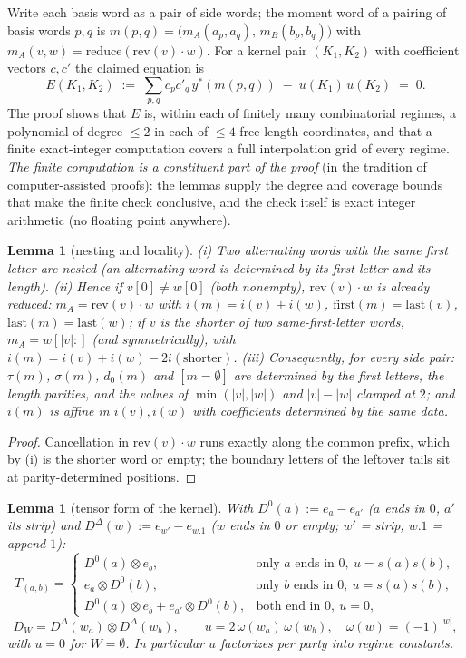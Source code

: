 \documentclass[11pt]{article}
\newtheorem{lemma}[theorem]{Lemma}
\begin{document}
Write each basis word as a pair of side words; the moment word of a
pairing of basis words $p,q$ is
$m(p,q)=\bigl(m_A(a_p,a_q),\,m_B(b_p,b_q)\bigr)$ with
$m_A(v,w)=\mathrm{reduce}(\mathrm{rev}(v)\cdot w)$. For a kernel pair
$(K_1,K_2)$ with coefficient vectors $c,c'$ the claimed equation is
\[
E(K_1,K_2)\;:=\;\sum_{p,q}c_pc'_q\,y^\ast(m(p,q))\;-\;u(K_1)\,u(K_2)
\;=\;0 .
\]
The proof shows that $E$ is, within each of finitely many combinatorial
regimes, a polynomial of degree $\le2$ in each of $\le4$ free length
coordinates, and that a finite exact-integer computation covers a full
interpolation grid of every regime. \emph{The finite computation is a
constituent part of the proof} (in the tradition of computer-assisted
proofs): the lemmas supply the degree and coverage bounds that make the
finite check conclusive, and the check itself is exact integer arithmetic
(no floating point anywhere).

\begin{lemma}[nesting and locality]\label{lem:nest}
(i) Two alternating words with the same first letter are nested (an
alternating word is determined by its first letter and its length).
(ii) Hence if $v[0]\ne w[0]$ (both nonempty), $\mathrm{rev}(v)\cdot w$ is
already reduced: $m_A=\mathrm{rev}(v)\cdot w$ with $i(m)=i(v)+i(w)$,
$\mathrm{first}(m)=\mathrm{last}(v)$, $\mathrm{last}(m)=\mathrm{last}(w)$;
if $v$ is the shorter of two same-first-letter words, $m_A=w[|v|:]$ (and
symmetrically), with $i(m)=i(v)+i(w)-2i(\text{shorter})$.
(iii) Consequently, for every side pair: $\tau(m)$, $\sigma(m)$, $d_0(m)$
and $[m=\emptyset]$ are determined by the first letters, the length
parities, and the values of $\min(|v|,|w|)$ and $|v|-|w|$ clamped at $2$;
and $i(m)$ is affine in $i(v),i(w)$ with coefficients determined by the
same data.
\end{lemma}

\begin{proof}
Cancellation in $\mathrm{rev}(v)\cdot w$ runs exactly along the common
prefix, which by (i) is the shorter word or empty; the boundary letters of
the leftover tails sit at parity-determined positions.
\end{proof}

\begin{lemma}[tensor form of the kernel]\label{lem:tensor}
With $D^0(a):=e_a-e_{a'}$ ($a$ ends in $0$, $a'$ its strip) and
$D^\Delta(w):=e_{w'}-e_{w.1}$ ($w$ ends in $0$ or empty; $w'$ = strip,
$w.1$ = append $1$):
\[
T_{(a,b)}=\begin{cases}
D^0(a)\otimes e_b,& \text{only }a\text{ ends in }0,\ u=s(a)s(b),\\
e_a\otimes D^0(b),& \text{only }b\text{ ends in }0,\ u=s(a)s(b),\\
D^0(a)\otimes e_b+e_{a'}\otimes D^0(b),&\text{both end in }0,\ u=0,
\end{cases}
\]
\[
D_W=D^\Delta(w_a)\otimes D^\Delta(w_b),\qquad
u=2\,\omega(w_a)\,\omega(w_b),\quad\omega(w)=(-1)^{|w|},
\]
with $u=0$ for $W=\emptyset$. In particular $u$ factorizes per party into
regime constants.
\end{lemma}
\end{document}
